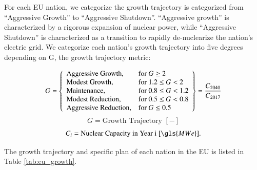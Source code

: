 For each \gls{EU} nation, we categorize the growth trajectory is categorized from
``Aggressive Growth'' to ``Aggressive Shutdown''. ``Aggressive growth'' is
characterized by a rigorous expansion of nuclear power, while
``Aggressive Shutdown'' is characterized as a transition to rapidly
de-nuclearize the nation's electric grid. We categorize each nation's growth 
trajectory into five degrees depending on G, the growth trajectory metric:

 \[
 G = \left\{\begin{array}{ll}
 \text{Aggressive Growth}, & \text{for } G \geq 2\\
 \text{Modest Growth}, & \text{for } 1.2 \leq G < 2\\
 \text{Maintenance}, & \text{for } 0.8 \leq G < 1.2 \\
 \text{Modest Reduction}, & \text{for } 0.5 \leq G< 0.8\\
 \text{Aggressive Reduction}, & \text{for } G \leq 0.5
 \end{array}\right\} = \frac{C_{2040}}{C_{2017}}\\\\
 \]
 \[
  G = \text{Growth Trajectory  } [-] 
 \]
 \[
 C_{i} = \text{Nuclear Capacity in Year i  } [\gls{MWe}].
 \]

The growth trajectory and specific plan of each nation in the \gls{EU} 
is listed in Table \ref{tab:eu_growth}.  

